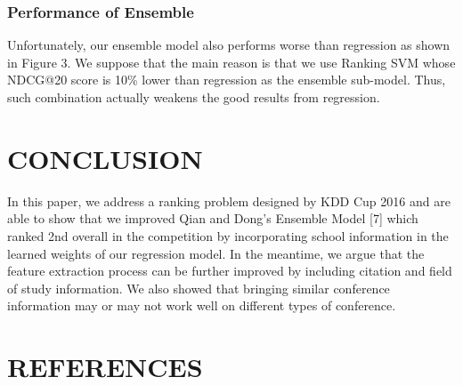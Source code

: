 \documentclass[letterpaper]{article}
\begin{document}
\subsubsection{Performance of Ensemble}
Unfortunately, our ensemble model also performs worse than regression as shown in Figure 3. We suppose that the main reason is that we use Ranking SVM whose NDCG@20 score is 10\% lower than regression as the ensemble sub-model. Thus, such combination actually weakens the good results from regression.
\section{CONCLUSION}
In this paper, we address a ranking problem designed by KDD Cup 2016 and are able to show that we improved Qian and Dong's Ensemble Model [7] which ranked 2nd overall in the competition by incorporating school information in the learned weights of our regression model.
In the meantime, we argue that the feature extraction process can be further improved by including citation and field of study information.  
We also showed that bringing similar conference information may or may not work well on different types of conference. 

\section{REFERENCES}
\end{document}
